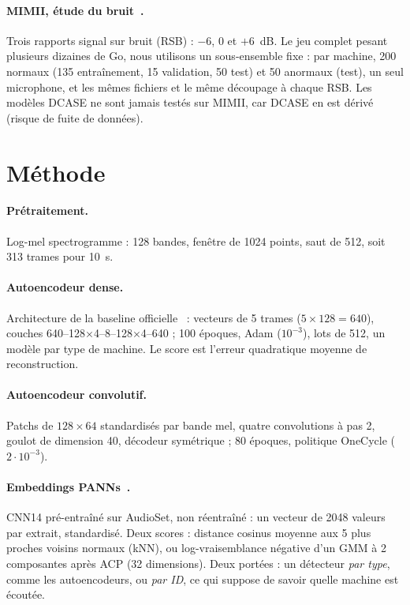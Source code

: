 \documentclass[11pt,a4paper]{article}
\begin{document}
\paragraph{MIMII, étude du bruit~\cite{purohit}.} Trois rapports signal sur bruit (RSB) : $-6$, 0 et $+6$~dB. Le jeu complet pesant
plusieurs dizaines de Go, nous utilisons un sous-ensemble fixe : par machine, 200 normaux (135 entraînement, 15 validation,
50 test) et 50 anormaux (test), un seul microphone, et les mêmes fichiers et le même découpage à chaque RSB. Les modèles
DCASE ne sont jamais testés sur MIMII, car DCASE en est dérivé (risque de fuite de données).

\section{Méthode}
\paragraph{Prétraitement.} Log-mel spectrogramme : 128 bandes, fenêtre de 1024 points, saut de 512, soit 313 trames pour 10~s.

\paragraph{Autoencodeur dense.} Architecture de la baseline officielle~\cite{koizumi} : vecteurs de 5 trames ($5\times128=640$),
couches 640--128$\times$4--8--128$\times$4--640 ; 100 époques, Adam ($10^{-3}$), lots de 512, un modèle par type de machine.
Le score est l'erreur quadratique moyenne de reconstruction.

\paragraph{Autoencodeur convolutif.} Patchs de $128\times64$ standardisés par bande mel, quatre convolutions à pas 2,
goulot de dimension 40, décodeur symétrique ; 80 époques, politique OneCycle ($2\cdot10^{-3}$).

\paragraph{Embeddings PANNs~\cite{kong}.} CNN14 pré-entraîné sur AudioSet, non réentraîné : un vecteur de 2048 valeurs par extrait,
standardisé. Deux scores : distance cosinus moyenne aux 5 plus proches voisins normaux (kNN), ou log-vraisemblance négative d'un
GMM à 2 composantes après ACP (32 dimensions). Deux portées : un détecteur \emph{par type}, comme les
autoencodeurs, ou \emph{par ID}, ce qui suppose de savoir quelle machine est écoutée.
\end{document}
